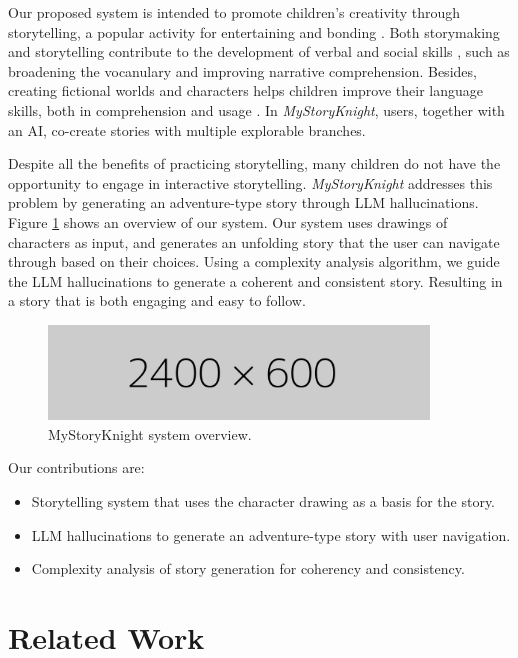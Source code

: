\documentclass[submit,techrep,english]{ipsj}
\begin{document}
Our proposed system is intended to promote children's creativity through storytelling, a popular activity for entertaining and bonding \cite{7:SunLLL17}. Both storymaking and storytelling contribute to the development of verbal and social skills \cite{9:RyokaiC99,5:CurrinDPCFGH23}, such as broadening the vocanulary and improving  narrative comprehension. Besides, creating fictional worlds and characters helps children improve their language skills, both in comprehension and usage \cite{13:abs-2011-04242}. In \textit{MyStoryKnight}, users, together with an AI, co-create stories with multiple explorable branches.

Despite all the benefits of practicing storytelling, many children do not have the opportunity to engage in interactive storytelling. \textit{MyStoryKnight} addresses this problem by generating an adventure-type story through LLM hallucinations. Figure \ref{fig:system-overview}  shows an overview of our system. Our system uses drawings of characters as input, and generates an unfolding story that the user can navigate through based on their choices. Using a complexity analysis algorithm, we guide the LLM hallucinations to generate a coherent and consistent story. Resulting in a story that is both engaging and easy to follow.

\begin{figure}[t]
    \centering
    \includegraphics[width=0.9\textwidth]{figures/2400x600px.png}
    \caption{MyStoryKnight system overview.}
    \label{fig:system-overview}
\end{figure}

Our contributions are:
\begin{itemize}
    \item Storytelling system that uses the character drawing as a basis for the story.
    \item LLM hallucinations to generate an adventure-type story with user navigation.
    \item Complexity analysis of story generation for coherency and consistency.
\end{itemize}


\section{Related Work}
\label{sec:related-work}
\end{document}
